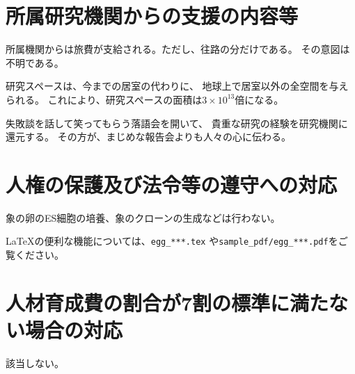 \documentclass[11pt,a4j,dvipdfmx]{jarticle} 					%
\newcommand{\研究課題名}{象の卵}
\newcommand{\研究機関名}{逢坂大学}
\newcommand{\研究代表者氏名}{湯川秀樹}
\begin{document}

\section{所属研究機関からの支援の内容等 }

\JSPSInstructions	%

	所属機関からは旅費が支給される。ただし、往路の分だけである。
	その意図は不明である。
	
	研究スペースは、今までの居室の代わりに、
	地球上で居室以外の全空間を与えられる。
	これにより、研究スペースの面積は\(3 \times 10^{13}\)倍になる。
	
	失敗談を話して笑ってもらう落語会を開いて、
	貴重な研究の経験を研究機関に還元する。
	その方が、まじめな報告会よりも人々の心に伝わる。




\section{人権の保護及び法令等の遵守への対応 }

	象の卵のES細胞の培養、象のクローンの生成などは行わない。

	\LaTeX の便利な機能については、\texttt{egg\_***.tex} や\texttt{sample\_pdf/egg\_***.pdf}をご覧ください。




\section{人材育成費の割合が7割の標準に満たない場合の対応}

	該当しない。



\end{document}
